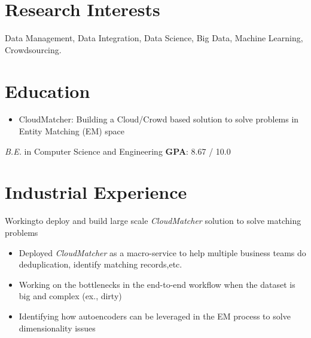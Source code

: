 \documentclass{resume}
\begin{document}



\section{Research Interests}
Data Management, Data Integration, Data Science, Big Data, Machine Learning, Crowdsourcing.

\section{Education}
\begin{itemize}
\item CloudMatcher: Building a Cloud/Crowd based solution to solve problems in Entity Matching (EM) space 
\end{itemize}
\textit{B.E.} in Computer Science and Engineering \textbf{GPA}: 8.67 / 10.0

\section{Industrial Experience}
Workingto deploy and build large scale \textit{CloudMatcher} solution to solve matching problems
\begin{itemize}
  \item Deployed \textit{CloudMatcher} as a macro-service to help multiple business teams do deduplication, identify matching records,etc.
  \item Working on the bottlenecks in the end-to-end workflow when the dataset is big and complex (ex., dirty)
  \item Identifying how autoencoders can be leveraged in the EM process to solve dimensionality issues
\end{itemize}
\end{document}
